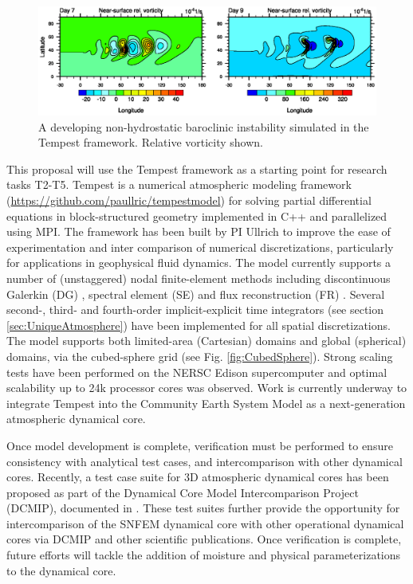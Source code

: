 \documentclass[11pt]{article}
\begin{document}
\begin{figure}
\begin{center}
\includegraphics[width=6in]{UMJSTest-Results}
\end{center}
\caption{A developing non-hydrostatic baroclinic instability simulated in the Tempest framework.  Relative vorticity shown.} \label{fig:TempestBaroclinicInstability}
\end{figure}

This proposal will use the Tempest framework as a starting point for research tasks T2-T5.  Tempest is a numerical atmospheric modeling framework (\url{https://github.com/paullric/tempestmodel}) \citep{ullrich2014global} for solving partial differential equations in block-structured geometry implemented in C++ and parallelized using MPI.  The framework has been built by PI Ullrich to improve the ease of experimentation and inter comparison of numerical discretizations, particularly for applications in geophysical fluid dynamics.  The model currently supports a number of (unstaggered) nodal finite-element methods including discontinuous Galerkin (DG) \citep{cockburn2000development}, spectral element (SE) \citep{maday1989spectral} and flux reconstruction (FR) \citep{huynh2007flux}.  Several second-, third- and fourth-order implicit-explicit time integrators (see section \ref{sec:UniqueAtmosphere}) have been implemented for all spatial discretizations.  The model supports both limited-area (Cartesian) domains and global (spherical) domains, via the cubed-sphere grid (see Fig. \ref{fig:CubedSphere}).  Strong scaling tests have been performed on the NERSC Edison supercomputer and optimal scalability up to 24k processor cores was observed.  Work is currently underway to integrate Tempest into the Community Earth System Model \citep{JWHetal2013BAMS} as a next-generation atmospheric dynamical core.

Once model development is complete, verification must be performed to ensure consistency with analytical test cases, and intercomparison with other dynamical cores.  Recently, a test case suite for 3D atmospheric dynamical cores has been proposed as part of the Dynamical Core Model Intercomparison Project (DCMIP), documented in \cite{DCMIP2012TESTCASES, JKPAUCJ2012QJRMS}.  These test suites further provide the opportunity for intercomparison of the SNFEM dynamical core with other operational dynamical cores via DCMIP and other scientific publications.  Once verification is complete, future efforts will tackle the addition of moisture and physical parameterizations to the dynamical core.
\end{document}
